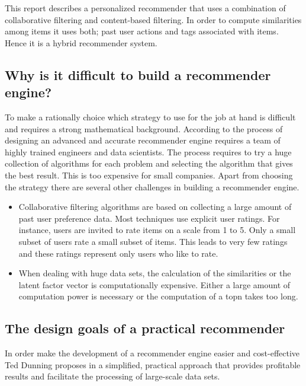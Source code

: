 This report describes a personalized recommender that uses a combination of collaborative filtering and content-based filtering. In order to compute similarities among items it uses both; past user actions and \glspl{tag} associated with items. Hence it is a hybrid recommender system.

\subsection{Why is it difficult to build a recommender engine?}

To make a rationally choice which strategy to use for the job at hand is difficult and requires a strong mathematical background. According to \cite{Dunning14} the process of designing an advanced and accurate recommender engine requires a team of highly trained engineers and data scientists. The process requires to try a huge collection of algorithms for each problem and selecting the algorithm that gives the best result. This is too expensive for small companies. Apart from choosing the strategy there are several other challenges in building a recommender engine.

\begin{itemize}
\item Collaborative filtering algorithms are based on collecting a large amount of past user preference data. Most techniques use explicit user ratings. For instance, users are invited to rate items on a scale from 1 to 5. Only a small subset of users rate a small subset of items. This leads to very few ratings and these ratings represent only users who like to rate.

\item When dealing with huge data sets, the calculation of the similarities or the latent factor vector is computationally expensive. Either a large amount of computation power is necessary or the computation of a \gls{topn} takes too long.
\end{itemize}

\subsection{The design goals of a practical recommender}
\label{sec:practical}

In order make the development of a recommender engine easier and cost-effective Ted Dunning  proposes in \cite{Dunning14} a simplified, practical approach that provides profitable results and facilitate the processing of large-scale data sets. 

